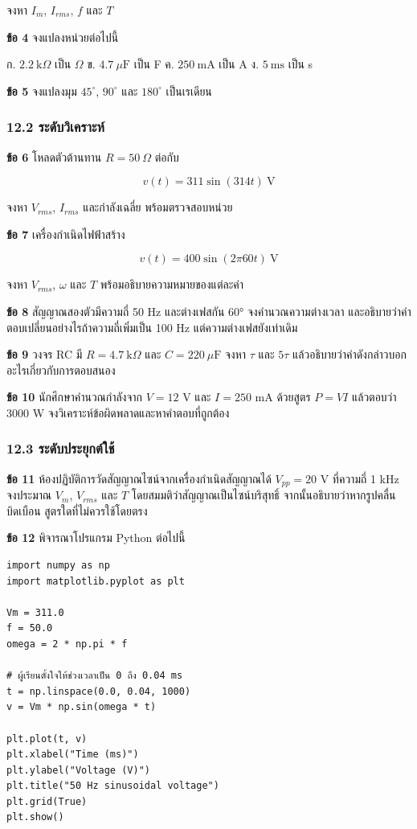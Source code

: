 จงหา $I_m$, $I_{rms}$, $f$ และ $T$

\textbf{ข้อ 4} จงแปลงหน่วยต่อไปนี้

ก. $2.2\ \mathrm{k}\Omega$ เป็น $\Omega$
ข. $4.7\ \mu\mathrm{F}$ เป็น F
ค. $250\ \mathrm{mA}$ เป็น A
ง. $5\ \mathrm{ms}$ เป็น s

\textbf{ข้อ 5} จงแปลงมุม $45^\circ$, $90^\circ$ และ $180^\circ$ เป็นเรเดียน

\subsubsection{12.2 ระดับวิเคราะห์}

\textbf{ข้อ 6} โหลดตัวต้านทาน $R=50\ \Omega$ ต่อกับ

\[
v(t)=311\sin(314t)\ \mathrm{V}
\]

จงหา $V_{rms}$, $I_{rms}$ และกำลังเฉลี่ย พร้อมตรวจสอบหน่วย

\textbf{ข้อ 7} เครื่องกำเนิดไฟฟ้าสร้าง

\[
v(t)=400\sin(2\pi60t)\ \mathrm{V}
\]

จงหา $V_{rms}$, $\omega$ และ $T$ พร้อมอธิบายความหมายของแต่ละค่า

\textbf{ข้อ 8} สัญญาณสองตัวมีความถี่ 50 Hz และต่างเฟสกัน 60° จงคำนวณความต่างเวลา และอธิบายว่าคำตอบเปลี่ยนอย่างไรถ้าความถี่เพิ่มเป็น 100 Hz แต่ความต่างเฟสยังเท่าเดิม

\textbf{ข้อ 9} วงจร RC มี $R=4.7\ \mathrm{k}\Omega$ และ $C=220\ \mu\mathrm{F}$ จงหา $\tau$ และ $5\tau$ แล้วอธิบายว่าค่าดังกล่าวบอกอะไรเกี่ยวกับการตอบสนอง

\textbf{ข้อ 10} นักศึกษาคำนวณกำลังจาก $V=12$ V และ $I=250$ mA ด้วยสูตร $P=VI$ แล้วตอบว่า 3000 W จงวิเคราะห์ข้อผิดพลาดและหาคำตอบที่ถูกต้อง

\subsubsection{12.3 ระดับประยุกต์ใช้}

\textbf{ข้อ 11} ห้องปฏิบัติการวัดสัญญาณไซน์จากเครื่องกำเนิดสัญญาณได้ $V_{pp}=20$ V ที่ความถี่ 1 kHz จงประมาณ $V_m$, $V_{rms}$ และ $T$ โดยสมมติว่าสัญญาณเป็นไซน์บริสุทธิ์ จากนั้นอธิบายว่าหากรูปคลื่นบิดเบือน สูตรใดที่ไม่ควรใช้โดยตรง

\textbf{ข้อ 12} พิจารณาโปรแกรม Python ต่อไปนี้

\begin{verbatim}
import numpy as np
import matplotlib.pyplot as plt

Vm = 311.0
f = 50.0
omega = 2 * np.pi * f

# ผู้เรียนตั้งใจให้ช่วงเวลาเป็น 0 ถึง 0.04 ms
t = np.linspace(0.0, 0.04, 1000)
v = Vm * np.sin(omega * t)

plt.plot(t, v)
plt.xlabel("Time (ms)")
plt.ylabel("Voltage (V)")
plt.title("50 Hz sinusoidal voltage")
plt.grid(True)
plt.show()
\end{verbatim}

